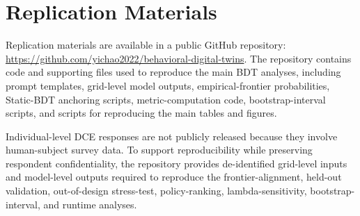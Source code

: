 \documentclass[11pt]{article}
\begin{document}
\section{Replication Materials}
\label{app:replication}

Replication materials are available in a public GitHub repository:
\url{https://github.com/yichao2022/behavioral-digital-twins}. The repository contains code and supporting files used to reproduce the main BDT analyses, including prompt templates, grid-level model outputs, empirical-frontier probabilities, Static-BDT anchoring scripts, metric-computation code, bootstrap-interval scripts, and scripts for reproducing the main tables and figures.

Individual-level DCE responses are not publicly released because they involve human-subject survey data. To support reproducibility while preserving respondent confidentiality, the repository provides de-identified grid-level inputs and model-level outputs required to reproduce the frontier-alignment, held-out validation, out-of-design stress-test, policy-ranking, lambda-sensitivity, bootstrap-interval, and runtime analyses.
\end{document}
